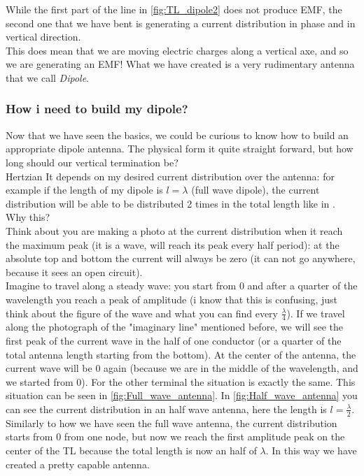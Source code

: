 While the first part of the line in \cref{fig:TL_dipole2} does not produce EMF, the second one that we have bent is generating a current distribution in phase and in vertical direction.\\
This does mean that we are moving electric charges along a vertical axe, and so we are generating an EMF! What we have created is a very rudimentary antenna that we call \emph{Dipole}.
\subsubsection*{How i need to build my dipole?}
Now that we have seen the basics, we could be curious to know how to build an appropriate dipole antenna. The physical form it quite straight forward, but how long should our vertical termination be?\\Hertzian 
It depends on my desired current distribution over the antenna: for example if the length of my dipole is $l=\lambda$ (full wave dipole), the current distribution will be able to be distributed 2 times in the total length like in . Why this?\\
Think about you are making a photo at the current distribution when it reach the maximum peak (it is a wave, will reach its peak every half period): at the absolute top and bottom the current will always be zero (it can not go anywhere, because it sees an open circuit).\\
Imagine to travel along a steady wave: you start from 0 and after a quarter of the wavelength you reach a peak of amplitude (i know that this is confusing, just think about the figure of the wave and what you can find every $\frac{\lambda}{4}$). If we travel along the photograph of the "imaginary line" mentioned before, we will see the first peak of the current wave in the half of one conductor (or a quarter of the total antenna length starting from the bottom). At the center of the antenna, the current wave will be 0 again (because we are in the middle of the wavelength, and we started from 0). For the other terminal the situation is exactly the same. This situation can be seen in \cref{fig:Full_wave_antenna}.
In \cref{fig:Half_wave_antenna} you can see the current distribution in an half wave antenna, here the length is $l=\frac{\lambda}{2}$.\\
Similarly to how we have seen the full wave antenna, the current distribution starts from 0 from one node, but now we reach the first amplitude peak on the center of the TL because the total length is now an half of $\lambda$. In this way we have created a pretty capable antenna.\\
